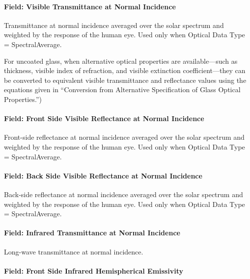 \paragraph{Field: Visible Transmittance at Normal Incidence}\label{field-visible-transmittance-at-normal-incidence}

Transmittance at normal incidence averaged over the solar spectrum and weighted by the response of the human eye. Used only when Optical Data Type = SpectralAverage.

For uncoated glass, when alternative optical properties are available---such as thickness, visible index of refraction, and visible extinction coefficient---they can be converted to equivalent visible transmittance and reflectance values using the equations given in ``Conversion from Alternative Specification of Glass Optical Properties.'')

\paragraph{Field: Front Side Visible Reflectance at Normal Incidence}\label{field-front-side-visible-reflectance-at-normal-incidence}

Front-side reflectance at normal incidence averaged over the solar spectrum and weighted by the response of the human eye. Used only when Optical Data Type = SpectralAverage.

\paragraph{Field: Back Side Visible Reflectance at Normal Incidence}\label{field-back-side-visible-reflectance-at-normal-incidence}

Back-side reflectance at normal incidence averaged over the solar spectrum and weighted by the response of the human eye. Used only when Optical Data Type = SpectralAverage.

\paragraph{Field: Infrared Transmittance at Normal Incidence}\label{field-infrared-transmittance-at-normal-incidence}

Long-wave transmittance at normal incidence.

\paragraph{Field: Front Side Infrared Hemispherical Emissivity}\label{field-front-side-infrared-hemispherical-emissivity}

